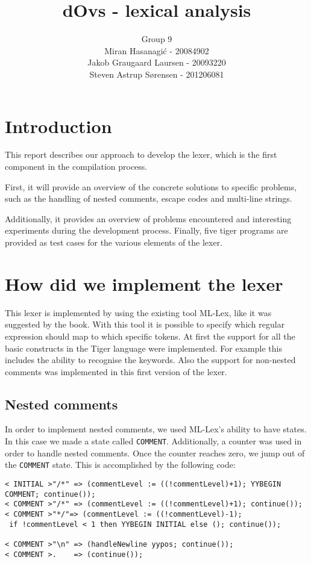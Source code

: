 \documentclass{article}
\title{dOvs - lexical analysis}
\author{
  Group 9 \\
  Miran Hasanagi\'{c} - 20084902 \\
  Jakob Graugaard Laursen - 20093220\\
  Steven Astrup S\o rensen - 201206081
}
\begin{document}
\maketitle

\section{Introduction}
This report describes our approach to develop the lexer, which is the first component in the compilation process. 

First, it will provide an overview of the concrete solutions to specific problems, such as the handling of nested comments, escape codes and multi-line strings. 

Additionally, it provides an overview of problems encountered and interesting experiments during the development process. Finally, five tiger programs are provided as test cases for the various elements of the lexer. 

\section{How did we implement the lexer}
This lexer is implemented by using the existing tool ML-Lex, like it was suggested by the book. With this tool it is possible to specify which regular expression should map to which specific tokens. At first the support for all the basic constructs in the Tiger language were implemented. For example this includes the ability to recognise the keywords. Also the support for non-nested comments was implemented in this first version of the lexer.

\subsection{Nested comments}
In order to implement nested comments, we used ML-Lex's ability to have states. In this case we made a state called \texttt{COMMENT}. Additionally, a counter was used in order to handle nested comments. Once the counter reaches zero, we jump out of the \texttt{COMMENT} state. This is accomplished by the following code:

\begin{lstlisting}[frame=single]
< INITIAL >"/*"	=> (commentLevel := ((!commentLevel)+1); YYBEGIN 
COMMENT; continue());
< COMMENT >"/*"	=> (commentLevel := ((!commentLevel)+1); continue());
< COMMENT >"*/"=> (commentLevel := ((!commentLevel)-1);
 if !commentLevel < 1 then YYBEGIN INITIAL else (); continue());

< COMMENT >"\n" => (handleNewline yypos; continue());
< COMMENT >.	=> (continue());
\end{lstlisting}
\end{document}
